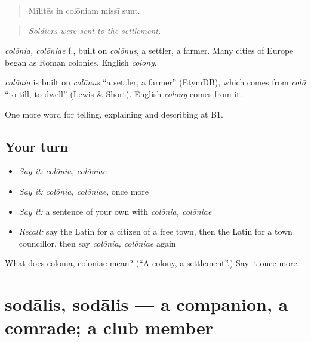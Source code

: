 \begin{quote}
Mīlitēs in colōniam missī sunt.
\end{quote}

\begin{quote}
\emph{Soldiers were sent to the settlement.}
\end{quote}

\emph{colōnia, colōniae} f., built on \emph{colōnus}, a settler, a farmer. Many cities of Europe began as Roman colonies. English \emph{colony}.

\begin{cousinweb}
\emph{colōnia} is built on \emph{colōnus} \textquotedblleft{}a settler, a farmer\textquotedblright{} (EtymDB), which comes from \emph{colō} \textquotedblleft{}to till, to dwell\textquotedblright{} (Lewis \& Short). English \emph{colony} comes from it.
\end{cousinweb}

\begin{grammarlens}[title={What you've built}]
One more word for telling, explaining and describing at B1.
\end{grammarlens}

\subsection*{Your turn}
\begin{itemize}
\raggedright
  \item \emph{Say it:} \emph{colōnia, colōniae}
  \item \emph{Say it:} \emph{colōnia, colōniae}, once more
  \item \emph{Say it:} a sentence of your own with \emph{colōnia, colōniae}
  \item \emph{Recall:} say the Latin for a citizen of a free town, then the Latin for a town councillor, then say \emph{colōnia, colōniae} again
\end{itemize}

\begin{tcolorbox}[breakable,colback=teal!4,colframe=teal!35!black,title={Before you move on}]
What does colōnia, colōniae mean? (\textquotedblleft{}A colony, a settlement\textquotedblright{}.) Say it once more.
\end{tcolorbox}
\section[sodālis, sodālis]{sodālis, sodālis — a companion, a comrade; a club member}

